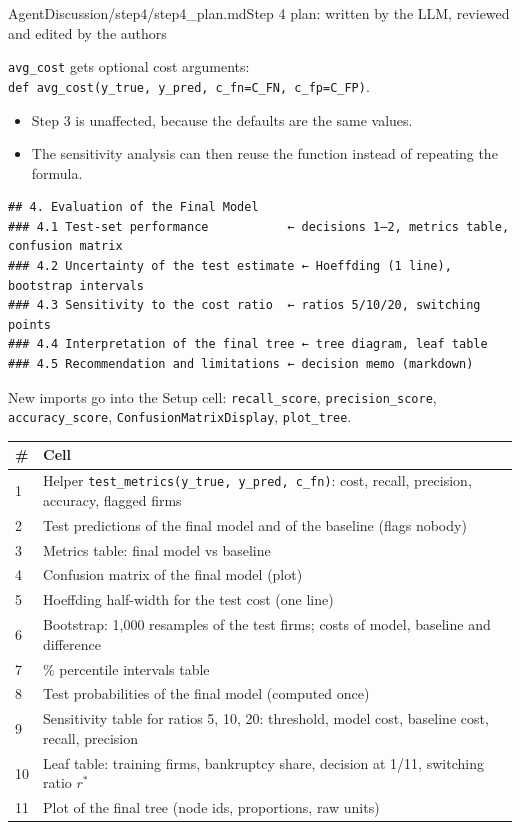 \begin{mdfile}{AgentDiscussion/\allowbreak{}step4/\allowbreak{}step4\_plan.md}{Step 4 plan: written by the LLM, reviewed and edited by the authors}

\texttt{avg\_cost} gets optional cost arguments: \texttt{def\ avg\_cost(y\_true,\ y\_pred,\ c\_fn=C\_FN,\ c\_fp=C\_FP)}.

\begin{itemize}
\tightlist
\item
  Step 3 is unaffected, because the defaults are the same values.
\item
  The sensitivity analysis can then reuse the function instead of repeating the formula.
\end{itemize}


\begin{Verbatim}[breaklines, fontsize=\footnotesize]
## 4. Evaluation of the Final Model
### 4.1 Test-set performance           ← decisions 1–2, metrics table, confusion matrix
### 4.2 Uncertainty of the test estimate ← Hoeffding (1 line), bootstrap intervals
### 4.3 Sensitivity to the cost ratio  ← ratios 5/10/20, switching points
### 4.4 Interpretation of the final tree ← tree diagram, leaf table
### 4.5 Recommendation and limitations ← decision memo (markdown)
\end{Verbatim}


New imports go into the Setup cell: \texttt{recall\_score}, \texttt{precision\_score}, \texttt{accuracy\_score}, \texttt{ConfusionMatrixDisplay}, \texttt{plot\_tree}.

{\def\LTcaptype{none} %
\begin{tabularx}{\linewidth}{@{}l>{\raggedright\arraybackslash}X@{}}
\toprule\noalign{}
\# & Cell \\
\midrule\noalign{}
1 & Helper \texttt{test\_metrics(y\_true,\ y\_pred,\ c\_fn)}: cost, recall, precision, accuracy, flagged firms \\
2 & Test predictions of the final model and of the baseline (flags nobody) \\
3 & Metrics table: final model vs baseline \\
4 & Confusion matrix of the final model (plot) \\
5 & Hoeffding half-width for the test cost (one line) \\
6 & Bootstrap: 1,000 resamples of the test firms; costs of model, baseline and difference \\
7 & 95\% percentile intervals table \\
8 & Test probabilities of the final model (computed once) \\
9 & Sensitivity table for ratios 5, 10, 20: threshold, model cost, baseline cost, recall, precision \\
10 & Leaf table: training firms, bankruptcy share, decision at 1/11, switching ratio \(r^*\) \\
11 & Plot of the final tree (node ids, proportions, raw units) \\
\bottomrule
\end{tabularx}
}


\end{mdfile}

